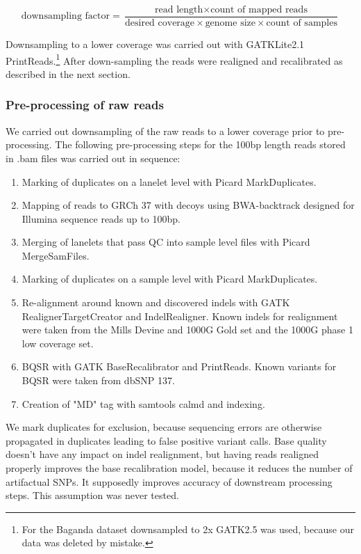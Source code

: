 \begin{equation}
\text{downsampling factor} =  \frac
{\text{read length} \times \text{count of mapped reads}}
{\text{desired coverage} \times \text{genome size} \times \text{count of samples}}
\label{eq:downsampling}
\end{equation}

Downsampling to a lower coverage was carried out with \gls{GATK}Lite2.1 PrintReads.\cite{DePristo2011}\footnote{For the Baganda dataset downsampled to 2x \gls{GATK}2.5 was used, because our data was deleted by mistake.}
After down-sampling the reads were realigned and recalibrated as described in the next section.

\subsubsection{Pre-processing of raw reads}
We carried out downsampling of the raw reads to a lower coverage prior to pre-processing. The following pre-processing steps for the 100bp length reads stored in .bam files was carried out in sequence:
\begin{enumerate}
\item Marking of duplicates on a lanelet level with Picard MarkDuplicates.
\item Mapping of reads to \gls{GRCh} 37 with decoys using BWA-backtrack\cite{Li15072009} designed for Illumina sequence reads up to 100bp.
\item Merging of lanelets that pass \gls{QC} into sample level files with Picard MergeSamFiles.
\item Marking of duplicates on a sample level with Picard MarkDuplicates.
\item Re-alignment around known and discovered indels with \gls{GATK} RealignerTargetCreator and IndelRealigner. Known indels for realignment were taken from the Mills Devine and \gls{1000G} Gold set and the 1000G phase 1 low coverage set.
\item \Gls{BQSR} with \gls{GATK} BaseRecalibrator and PrintReads. Known variants for \gls{BQSR} were taken from dbSNP 137.
\item Creation of "MD" tag with samtools calmd and indexing.
\end{enumerate}

We mark duplicates for exclusion, because sequencing errors are otherwise propagated in duplicates leading to false positive variant calls. Base quality doesn't have any impact on indel realignment, but having reads realigned properly improves the base recalibration model, because it reduces the number of artifactual \glspl{SNP}. It supposedly improves accuracy of downstream processing steps. This assumption was never tested.

